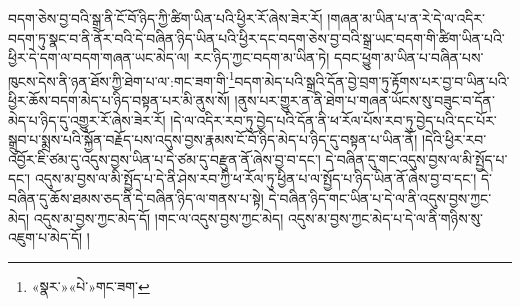 བདག་ཅེས་བྱ་བའི་སྒྲ་ནི་ངོ་བོ་ཉིད་ཀྱི་ཚིག་ཡིན་པའི་ཕྱིར་རོ་ཞེས་ཟེར་རོ། །གཞན་མ་ཡིན་པ་ན་རེ་དེ་ལ་འདིར་བདག་ཏུ་སྣང་བ་ནི་ནོར་བའི་དེ་བཞིན་ཉིད་ཡིན་པའི་ཕྱིར་དང་བདག་ཅེས་བྱ་བའི་སྒྲ་ཡང་བདག་གི་ཚིག་ཡིན་པའི་ཕྱིར་དེ་དག་ལ་བདག་གཞན་ཡང་མེད་ལ། རང་ཉིད་ཀྱང་བདག་མ་ཡིན་ཏེ། དབང་ཕྱུག་མ་ཡིན་པ་བཞིན་པས་ཁུངས་དེས་ནི་ཉན་ཐོས་ཀྱི་ཐེག་པ་ལ་:གང་ཟག་གི་\footnote{«སྣར་»«པེ་»གང་ཟག་}བདག་མེད་པའི་སྒྲའི་དོན་བྱེ་བྲག་ཏུ་རྟོགས་པར་བྱ་བ་ཡིན་པའི་ཕྱིར་ཆོས་བདག་མེད་པ་ཉིད་བསྟན་པར་མི་ནུས་སོ། །ནུས་པར་གྱུར་ན་ནི་ཐེག་པ་གཞན་ཡོངས་སུ་བཟུང་བ་དོན་མེད་པ་ཉིད་དུ་འགྱུར་རོ་ཞེས་ཟེར་རོ། །དེ་ལ་འདིར་རབ་ཏུ་བྱེད་པའི་དོན་ནི་ཕ་རོལ་པོས་རབ་ཏུ་བྱེད་པའི་དང་པོར་སྒྲུབ་པ་སྨྲས་པའི་སྐྱོན་བརྗོད་པས་འདུས་བྱས་རྣམས་ངོ་བོ་ཉིད་མེད་པ་ཉིད་དུ་བསྟན་པ་ཡིན་ནོ། །དེའི་ཕྱིར་རབ་འབྱོར་ཇི་ཙམ་དུ་འདུས་བྱས་ཡིན་པ་དེ་ཙམ་དུ་བརྫུན་ནོ་ཞེས་བྱ་བ་དང་། དེ་བཞིན་དུ་གང་འདུས་བྱས་ལ་མི་སྤྱོད་པ་དང་། འདུས་མ་བྱས་ལ་མི་སྤྱོད་པ་དེ་ནི་ཤེས་རབ་ཀྱི་ཕ་རོལ་ཏུ་ཕྱིན་པ་ལ་སྤྱོད་པ་ཉིད་ཡིན་ནོ་ཞེས་བྱ་བ་དང་། དེ་བཞིན་དུ་ཆོས་ཐམས་ཅད་ནི་དེ་བཞིན་ཉིད་ལ་གནས་པ་སྟེ། དེ་བཞིན་ཉིད་གང་ཡིན་པ་དེ་ལ་ནི་འདུས་བྱས་ཀྱང་མེད། འདུས་མ་བྱས་ཀྱང་མེད་དོ། །གང་ལ་འདུས་བྱས་ཀྱང་མེད། འདུས་མ་བྱས་ཀྱང་མེད་པ་དེ་ལ་ནི་གཉིས་སུ་འཇུག་པ་མེད་དོ། །
